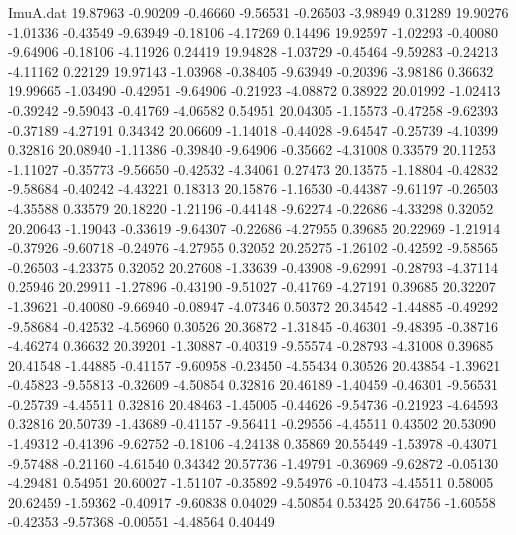 \begin{filecontents}{ImuA.dat}
  19.87963   -0.90209   -0.46660   -9.56531   -0.26503   -3.98949    0.31289
  19.90276   -1.01336   -0.43549   -9.63949   -0.18106   -4.17269    0.14496
  19.92597   -1.02293   -0.40080   -9.64906   -0.18106   -4.11926    0.24419
  19.94828   -1.03729   -0.45464   -9.59283   -0.24213   -4.11162    0.22129
  19.97143   -1.03968   -0.38405   -9.63949   -0.20396   -3.98186    0.36632
  19.99665   -1.03490   -0.42951   -9.64906   -0.21923   -4.08872    0.38922
  20.01992   -1.02413   -0.39242   -9.59043   -0.41769   -4.06582    0.54951
  20.04305   -1.15573   -0.47258   -9.62393   -0.37189   -4.27191    0.34342
  20.06609   -1.14018   -0.44028   -9.64547   -0.25739   -4.10399    0.32816
  20.08940   -1.11386   -0.39840   -9.64906   -0.35662   -4.31008    0.33579
  20.11253   -1.11027   -0.35773   -9.56650   -0.42532   -4.34061    0.27473
  20.13575   -1.18804   -0.42832   -9.58684   -0.40242   -4.43221    0.18313
  20.15876   -1.16530   -0.44387   -9.61197   -0.26503   -4.35588    0.33579
  20.18220   -1.21196   -0.44148   -9.62274   -0.22686   -4.33298    0.32052
  20.20643   -1.19043   -0.33619   -9.64307   -0.22686   -4.27955    0.39685
  20.22969   -1.21914   -0.37926   -9.60718   -0.24976   -4.27955    0.32052
  20.25275   -1.26102   -0.42592   -9.58565   -0.26503   -4.23375    0.32052
  20.27608   -1.33639   -0.43908   -9.62991   -0.28793   -4.37114    0.25946
  20.29911   -1.27896   -0.43190   -9.51027   -0.41769   -4.27191    0.39685
  20.32207   -1.39621   -0.40080   -9.66940   -0.08947   -4.07346    0.50372
  20.34542   -1.44885   -0.49292   -9.58684   -0.42532   -4.56960    0.30526
  20.36872   -1.31845   -0.46301   -9.48395   -0.38716   -4.46274    0.36632
  20.39201   -1.30887   -0.40319   -9.55574   -0.28793   -4.31008    0.39685
  20.41548   -1.44885   -0.41157   -9.60958   -0.23450   -4.55434    0.30526
  20.43854   -1.39621   -0.45823   -9.55813   -0.32609   -4.50854    0.32816
  20.46189   -1.40459   -0.46301   -9.56531   -0.25739   -4.45511    0.32816
  20.48463   -1.45005   -0.44626   -9.54736   -0.21923   -4.64593    0.32816
  20.50739   -1.43689   -0.41157   -9.56411   -0.29556   -4.45511    0.43502
  20.53090   -1.49312   -0.41396   -9.62752   -0.18106   -4.24138    0.35869
  20.55449   -1.53978   -0.43071   -9.57488   -0.21160   -4.61540    0.34342
  20.57736   -1.49791   -0.36969   -9.62872   -0.05130   -4.29481    0.54951
  20.60027   -1.51107   -0.35892   -9.54976   -0.10473   -4.45511    0.58005
  20.62459   -1.59362   -0.40917   -9.60838    0.04029   -4.50854    0.53425
  20.64756   -1.60558   -0.42353   -9.57368   -0.00551   -4.48564    0.40449

\end{filecontents}
